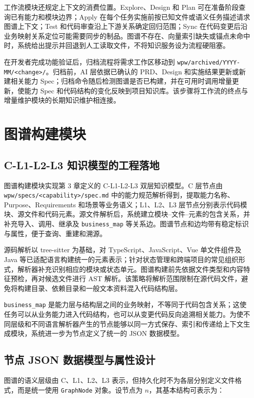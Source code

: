 工作流模块还规定上下文的消费位置。Explore、Design 和 Plan 可在准备阶段查询已有能力和模块边界；Apply 在每个任务实施前按已知文件或语义任务描述请求图谱上下文；Test 和代码审查沿上下游关系确定回归范围；Sync 在代码变更后沿业务映射关系定位可能需要同步的制品。图谱不存在、向量索引缺失或锚点未命中时，系统给出提示并回退到人工读取文件，不将知识服务设为流程硬阻塞。

在开发者完成功能验证后，归档流程将需求工作区移动到 \texttt{wpw/archived/YYYY-MM/<change>/}。归档前，AI 层依据已确认的 PRD、Design 和实施结果更新或新建相关能力 Spec；归档命令随后检测图谱是否已构建，并在可用时调用增量更新，使能力 Spec 和代码结构的变化反映到项目知识库。该步骤将工作流的终点与增量维护模块的长期知识维护相连接。


\section{图谱构建模块}

\subsection{C-L1-L2-L3 知识模型的工程落地}
图谱构建模块实现第 3 章定义的 C-L1-L2-L3 双层知识模型。C 层节点由 \texttt{wpw/specs/<capability>/spec.md} 中的能力规范解析得到，提取能力名称、Purpose、Requirements 和场景等业务语义；L1、L2、L3 层节点分别表示代码模块、源文件和代码元素。源文件解析后，系统建立模块--文件--元素的包含关系，并补充导入、调用、继承及 \texttt{business\_map} 等关系边。图谱节点和边均带有稳定标识与属性，便于查询、重建和溯源。

源码解析以 tree-sitter 为基础，对 TypeScript、JavaScript、Vue 单文件组件及 Java 等已适配语言构建统一的元素表示；针对状态管理和跨端项目的常见组织形式，解析器补充识别相应的模块或状态单元。图谱构建前先依据文件类型和内容特征预检，再对候选文件进行 AST 解析。该策略将解析范围限制在源代码文件，避免将构建目录、依赖目录和一般文本资料混入代码结构层。

\texttt{business\_map} 是能力层与结构层之间的业务映射，不等同于代码包含关系；这使任务可以从业务能力进入代码结构，也可以从变更代码反向追溯相关能力。为使不同层级和不同语言解析器产生的节点能够以同一方式保存、索引和传递给上下文生成模块，系统进一步为节点定义了统一的 JSON 数据模型。


\subsection{节点 JSON 数据模型与属性设计}
图谱的语义层级由 C、L1、L2、L3 表示，但持久化时不为各层分别定义文件格式，而是统一使用 \texttt{GraphNode} 对象。设节点为 $n$，其基本结构可表示为：

